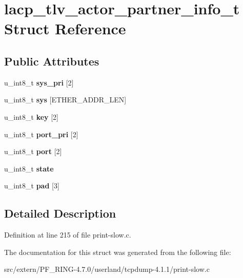 \hypertarget{structlacp__tlv__actor__partner__info__t}{
\section{lacp\_\-tlv\_\-actor\_\-partner\_\-info\_\-t Struct Reference}
\label{structlacp__tlv__actor__partner__info__t}
}
\subsection*{Public Attributes}
\begin{DoxyCompactItemize}
\item 
\hypertarget{structlacp__tlv__actor__partner__info__t_a635eb745f7458ba1d5882f740096e55c}{
u\_\-int8\_\-t {\bfseries sys\_\-pri} \mbox{[}2\mbox{]}}
\label{structlacp__tlv__actor__partner__info__t_a635eb745f7458ba1d5882f740096e55c}

\item 
\hypertarget{structlacp__tlv__actor__partner__info__t_a5b57c172d57e8c9176cc50251f9b5487}{
u\_\-int8\_\-t {\bfseries sys} \mbox{[}ETHER\_\-ADDR\_\-LEN\mbox{]}}
\label{structlacp__tlv__actor__partner__info__t_a5b57c172d57e8c9176cc50251f9b5487}

\item 
\hypertarget{structlacp__tlv__actor__partner__info__t_aeee24e97b2c483277e54b6adc11c1a80}{
u\_\-int8\_\-t {\bfseries key} \mbox{[}2\mbox{]}}
\label{structlacp__tlv__actor__partner__info__t_aeee24e97b2c483277e54b6adc11c1a80}

\item 
\hypertarget{structlacp__tlv__actor__partner__info__t_a854813486f66f2354d96c4d0976cd891}{
u\_\-int8\_\-t {\bfseries port\_\-pri} \mbox{[}2\mbox{]}}
\label{structlacp__tlv__actor__partner__info__t_a854813486f66f2354d96c4d0976cd891}

\item 
\hypertarget{structlacp__tlv__actor__partner__info__t_a3071390acbb0b53525d752611a8e8a62}{
u\_\-int8\_\-t {\bfseries port} \mbox{[}2\mbox{]}}
\label{structlacp__tlv__actor__partner__info__t_a3071390acbb0b53525d752611a8e8a62}

\item 
\hypertarget{structlacp__tlv__actor__partner__info__t_a491f965fb96890e8916a3b2845492df6}{
u\_\-int8\_\-t {\bfseries state}}
\label{structlacp__tlv__actor__partner__info__t_a491f965fb96890e8916a3b2845492df6}

\item 
\hypertarget{structlacp__tlv__actor__partner__info__t_ae82c16c677d927a773ac877827eb43a1}{
u\_\-int8\_\-t {\bfseries pad} \mbox{[}3\mbox{]}}
\label{structlacp__tlv__actor__partner__info__t_ae82c16c677d927a773ac877827eb43a1}

\end{DoxyCompactItemize}


\subsection{Detailed Description}


Definition at line 215 of file print-\/slow.c.



The documentation for this struct was generated from the following file:\begin{DoxyCompactItemize}
\item 
src/extern/PF\_\-RING-\/4.7.0/userland/tcpdump-\/4.1.1/print-\/slow.c\end{DoxyCompactItemize}
